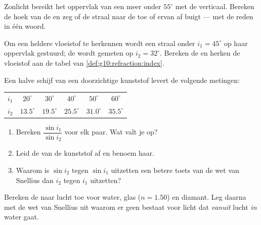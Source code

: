 \begin{exercise}[$\star$]\label{exo:g10:refraction:4}
Zonlicht bereikt het oppervlak van een meer onder $55^\circ$ met de
verticaal. Bereken de hoek van de  en zeg of de straal
naar de  toe of ervan af buigt --- met de reden in één woord.
\end{exercise}

\begin{exercise}[$\star$]\label{exo:g10:refraction:5}
Om een heldere vloeistof te herkennen wordt een straal onder
$i_1 = 45^\circ$ op haar oppervlak gestuurd; de  wordt
gemeten op $i_2 = 32^\circ$. Bereken de  en herken de
vloeistof aan de tabel van \cref{def:g10:refraction:index}.
\end{exercise}

\begin{exercise}[$\star\star$]\label{exo:g10:refraction:6}
Een halve schijf van een doorzichtige kunststof levert de volgende
metingen:
\begin{center}
\begin{tabular}{lccccc}
$i_1$ & $20^\circ$ & $30^\circ$ & $40^\circ$ & $50^\circ$ & $60^\circ$ \\
$i_2$ & $13.5^\circ$ & $19.5^\circ$ & $25.5^\circ$ & $31.0^\circ$
      & $35.5^\circ$ \\
\end{tabular}
\end{center}
\begin{enumerate}
  \item Bereken $\dfrac{\sin i_1}{\sin i_2}$ voor elk paar. Wat valt je
        op?
  \item Leid de  van de kunststof af en benoem haar.
  \item Waarom is $\sin i_2$ tegen $\sin i_1$ uitzetten een betere toets
        van de wet van Snellius dan $i_2$ tegen $i_1$ uitzetten?
\end{enumerate}
\end{exercise}

\begin{exercise}[$\star\star$]\label{exo:g10:refraction:7}
Bereken de  naar lucht toe voor water, glas ($n = 1.50$) en
diamant. Leg daarna met de wet van Snellius uit waarom er geen 
bestaat voor licht dat \emph{vanuit} lucht \emph{in} water gaat.
\end{exercise}

